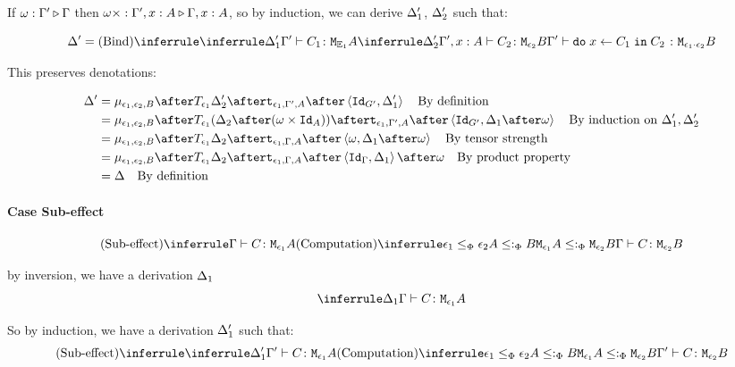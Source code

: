 {    If $\omega : \Gamma' \triangleright \Gamma$ then $\omega\times : \Gamma',x:A \triangleright \Gamma, x: A$, so by induction, we can derive $\Delta_1'$, $\Delta_2'$ such that:
    
    \begin{equation}
        \D' = \ntreeruleII{Bind}{
            \treeruleI{\D_1'}{\typerelation{\G'}{C_1}{\M{\E_1}{A}}}
            }{
            \treeruleI{\D_2'}{\typerelation{\G',x: A}{C_2}{\M{\e_2}{B}}}
        }{
            \typerelation{\G'}{\doin{x}{C_1}{C_2}}{\M{\e_1\dot\e_2}{B}}
        }
    \end{equation}
    
    This preserves denotations:
    
    \begin{align}
        \D' & = \bind{\e_1}{\e_2}{B}\after\T{\e_1}{\D_2'}\after\tstrength{\e_1}{\G'}{A}\after\pr{\Id{G'}}{\D_1'}\qt{By definition}\\
        & = \bind{\e_1}{\e_2}{B}\after\T{\e_1}{(\D_2\after(\w\times\Id{A}))}\after\tstrength{\e_1}{\G'}{A}\after\pr{\Id{G'}}{\D_1\after\w}\qt{By induction on $\D_1', \D_2'$}\\
        & = \bind{\e_1}{\e_2}{B}\after\T{\e_1}{\D_2}\after\tstrength{\e_1}{\G}{A}\after\pr{\w}{\D_1\after\w}\qt{By tensor strength}\\
        & = \bind{\e_1}{\e_2}{B}\after\T{\e_1}{\D_2}\after\tstrength{\e_1}{\G}{A}\after\pr{\idg}{\D_1}\after\w\qt{By product property}\\
        & = \D \qt{By definition}
    \end{align}
    
    
    
    
    
    \paragraph{Case Sub-effect}
    
    
    \begin{equation}
        \ntreeruleII{Sub-effect}{\gtyperelation{C}{\M{\e_1}{A}}}{ \subeffecttree{\e_1}{A}{\e_2}{B}}{\gtyperelation{C}{\M{\e_2}{B}}}
    \end{equation}
    
    by inversion, we have a derivation $\Delta_1$
    \begin{equation}
        \treeruleI{\D_1}{\gtyperelation{C}{\M{\e_1}{A}}}
    \end{equation}
    
    So by induction, we have a derivation $\Delta_1'$ such that:
    \begin{equation}
        \ntreeruleII{Sub-effect}{\treeruleI{\D_1'}{\typerelation{\G'}{C}{\M{\e_1}{A}}}}{ \subeffecttree{\e_1}{A}{\e_2}{B}}{\typerelation{\G'}{C}{\M{\e_2}{B}}}
    \end{equation}
    
}
